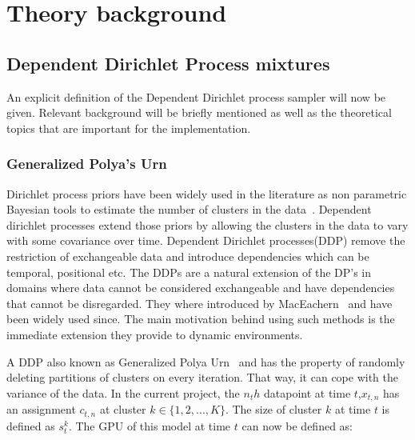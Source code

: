 \documentclass[twoside,hidelinks]{article}
\begin{document}

\section{Theory background}
\label{sec:theory}

\subsection{Dependent Dirichlet Process mixtures}
An explicit definition of the Dependent Dirichlet process sampler will now be given. Relevant background will be briefly mentioned as well as the theoretical topics that are important for the implementation.


\subsubsection{Generalized Polya's Urn}
Dirichlet process priors have been widely used in the literature as non parametric Bayesian tools to estimate the number of clusters in the data~\cite{antoniak}. Dependent dirichlet processes extend those priors by allowing the clusters in the data to vary with some covariance over time. Dependent Dirichlet processes(DDP) remove the restriction of exchangeable data and introduce dependencies which can be temporal, positional etc. The DDPs are a natural extension of the DP's in domains where data cannot be considered exchangeable and have dependencies that cannot be disregarded. They where introduced by MacEachern~\cite{theory:ddp} and have been widely used since. The main motivation behind using such methods is the immediate extension they provide to dynamic environments. 

A DDP also known as Generalized Polya Urn~\cite{caron} and has the property of randomly deleting partitions of clusters on every iteration. That way, it can cope with the variance of the data. In the current project, the $n_th$ datapoint at time $t$,$x_{t,n}$ has an assignment $c_{t,n}$ at cluster $k \in \{1,2,..., K\} $. The size of cluster $k$ at time $t$ is defined as $s_t^k$. The GPU of this model at time $t$ can now be defined as:
\end{document}

